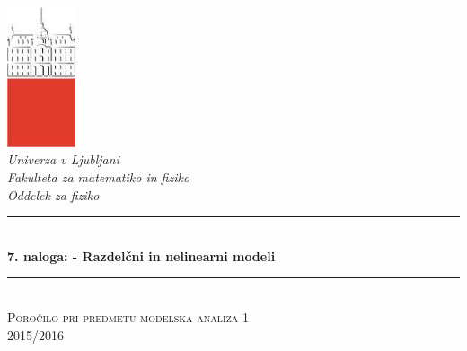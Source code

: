 \documentclass[slovene,11pt,a4paper]{article}
\numberwithin{equation}{section} %
\numberwithin{figure}{section} %
\numberwithin{table}{section} %
\begin{document}
\begin{titlepage}

\newcommand{\HRule}{\rule{\linewidth}{0.5mm}} %

\center %


 

\includegraphics[width=2cm]{slike/aaa}\\[0.5cm]
 
\textit{Univerza v Ljubljani}\\
\textit{Fakulteta za {\color{red}matematiko in fiziko}}\\[0.5cm]

\emph{Oddelek za fiziko}\\[0.5cm] %


\HRule \\[0.4cm]
\huge {\bfseries 7. naloga: - Razdelčni in nelinearni modeli}\\[0.4cm] %
\HRule \\[0.5cm] 

 \textsc{\large Poročilo pri predmetu modelska analiza 1}\\
 \textsc{\large 2015/2016}\\[1cm] %
 

\end{titlepage}
\end{document}
